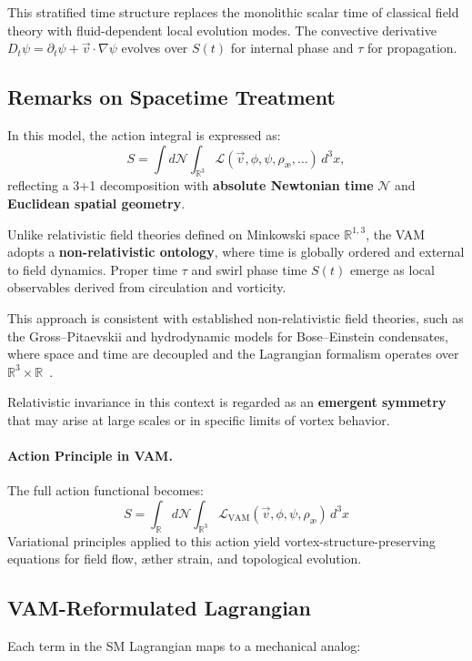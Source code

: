 This stratified time structure replaces the monolithic scalar time of classical field theory with fluid-dependent local evolution modes. The convective derivative \( D_t \psi = \partial_t \psi + \vec{v} \cdot \nabla \psi \) evolves over \( S(t) \) for internal phase and \( \tau \) for propagation.

\subsection*{Remarks on Spacetime Treatment}
In this model, the action integral is expressed as:
\[
    S = \int d\mathcal{N} \int_{\mathbb{R}^3} \mathcal{L}(\vec{v}, \phi, \psi, \rho_\text{\ae}, \dots) \, d^3x,
\]
reflecting a 3+1 decomposition with \textbf{absolute Newtonian time} \( \mathcal{N} \) and \textbf{Euclidean spatial geometry}.

Unlike relativistic field theories defined on Minkowski space \( \mathbb{R}^{1,3} \), the VAM adopts a \textbf{non-relativistic ontology}, where time is globally ordered and external to field dynamics. Proper time \( \tau \) and swirl phase time \( S(t) \) emerge as local observables derived from circulation and vorticity.

This approach is consistent with established non-relativistic field theories, such as the Gross--Pitaevskii and hydrodynamic models for Bose--Einstein condensates, where space and time are decoupled and the Lagrangian formalism operates over \( \mathbb{R}^3 \times \mathbb{R} \)~\cite{Pethick2008BEC}.

Relativistic invariance in this context is regarded as an \textbf{emergent symmetry} that may arise at large scales or in specific limits of vortex behavior.

\paragraph{Action Principle in VAM.}
The full action functional becomes:
\[
S = \int_{\mathbb{R}} d\mathcal{N} \int_{\mathbb{R}^3} \mathcal{L}_{\text{VAM}}(\vec{v}, \phi, \psi, \rho_\text{\ae}) \, d^3x
\]
Variational principles applied to this action yield vortex-structure-preserving equations for field flow, \ae{}ther strain, and topological evolution.

\subsection{VAM-Reformulated Lagrangian}
Each term in the SM Lagrangian maps to a mechanical analog:

